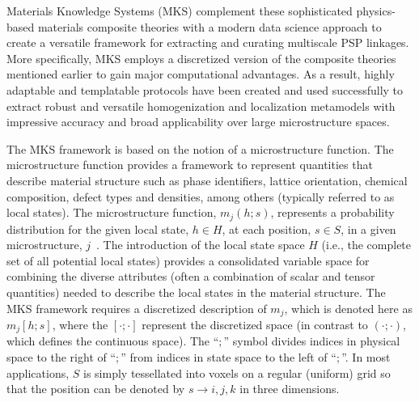 \documentclass{bmcart}
\begin{document}
Materials Knowledge Systems (MKS) \cite{landi2010multi,
  kalidindi2010novel, yabansu2014calibrated, al2012multi,
  kalidindi2011microstructure, gupta2015structure, cceccen2014data}
complement these sophisticated physics-based materials composite
theories with a modern data science approach to create a versatile
framework for extracting and curating multiscale PSP linkages. More
specifically, MKS employs a discretized version of the composite
theories mentioned earlier to gain major computational advantages. As
a result, highly adaptable and templatable protocols have been created
and used successfully to extract robust and versatile homogenization
and localization metamodels with impressive accuracy and broad
applicability over large microstructure spaces.

The MKS framework is based on the notion of a microstructure function.
The microstructure function provides a framework to represent
quantities that describe material structure such as phase identifiers,
lattice orientation, chemical composition, defect types and densities,
among others (typically referred to as local states). The
microstructure function, $m_j \left(h; s\right)$, represents a
probability distribution for the given local state, $h \in H$, at each
position, $s \in S$, in a given microstructure,
$j$~\cite{niezgoda2013novel, niezgoda2011understanding,
  qidwai2012estimating, niezgoda2010optimized}. The introduction of
the local state space $H$ (i.e., the complete set of all potential
local states) provides a consolidated variable space for combining the
diverse attributes (often a combination of scalar and tensor
quantities) needed to describe the local states in the material
structure.  The MKS framework requires a discretized description of
$m_j$, which is denoted here as $m_j\left[h; s\right]$, where the
$\left[\cdot;\cdot\right]$ represent the discretized space (in
contrast to $\left(\cdot;\cdot\right)$, which defines the continuous
space).  The ``$;$'' symbol divides indices in physical space to the
right of ``$;$'' from indices in state space to the left of
``$;$''. In most applications, $S$ is simply tessellated into voxels
on a regular (uniform) grid so that the position can be denoted by
$s\rightarrow i,j,k$ in three dimensions.
\end{document}
